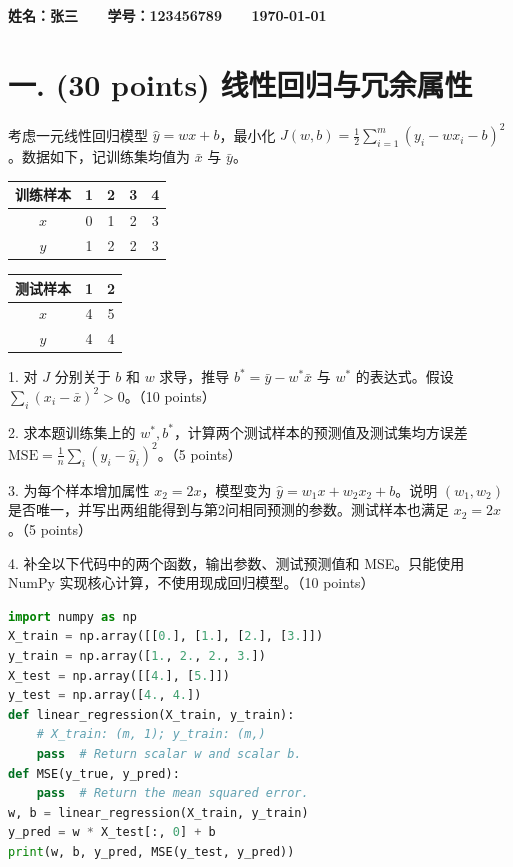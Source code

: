 \documentclass[8pt]{article}
\begin{document}
\textbf{\color{blue} \Large 姓名：张三 \ \ \ 学号：123456789 \ \ \ \today}



\section*{一. (30 points) 线性回归与冗余属性}
考虑一元线性回归模型 $\hat y=wx+b$，最小化 $J(w,b)=\frac12\sum_{i=1}^{m}(y_i-wx_i-b)^2$。数据如下，记训练集均值为 $\bar x$ 与 $\bar y$。
\begin{center}
\begin{tabular}{ccccc}
\toprule
训练样本 & 1 & 2 & 3 & 4 \\
\midrule
$x$ & 0 & 1 & 2 & 3 \\
$y$ & 1 & 2 & 2 & 3 \\
\bottomrule
\end{tabular}
\qquad
\begin{tabular}{ccc}
\toprule
测试样本 & 1 & 2 \\
\midrule
$x$ & 4 & 5 \\
$y$ & 4 & 4 \\
\bottomrule
\end{tabular}
\end{center}
1. 对 $J$ 分别关于 $b$ 和 $w$ 求导，推导 $b^*=\bar y-w^*\bar x$ 与 $w^*$ 的表达式。假设 $\sum_i(x_i-\bar x)^2>0$。（10 points）

2. 求本题训练集上的 $w^*,b^*$，计算两个测试样本的预测值及测试集均方误差 $\mathrm{MSE}=\frac1n\sum_i(y_i-\hat y_i)^2$。（5 points）

3. 为每个样本增加属性 $x_2=2x$，模型变为 $\hat y=w_1x+w_2x_2+b$。说明 $(w_1,w_2)$ 是否唯一，并写出两组能得到与第2问相同预测的参数。测试样本也满足 $x_2=2x$。（5 points）

4. 补全以下代码中的两个函数，输出参数、测试预测值和 MSE。只能使用 NumPy 实现核心计算，不使用现成回归模型。（10 points）
\begin{lstlisting}[language=Python,caption=线性回归代码样例]
import numpy as np
X_train = np.array([[0.], [1.], [2.], [3.]])
y_train = np.array([1., 2., 2., 3.])
X_test = np.array([[4.], [5.]])
y_test = np.array([4., 4.])
def linear_regression(X_train, y_train):
    # X_train: (m, 1); y_train: (m,)
    pass  # Return scalar w and scalar b.
def MSE(y_true, y_pred):
    pass  # Return the mean squared error.
w, b = linear_regression(X_train, y_train)
y_pred = w * X_test[:, 0] + b
print(w, b, y_pred, MSE(y_test, y_pred))
\end{lstlisting}
\end{document}
